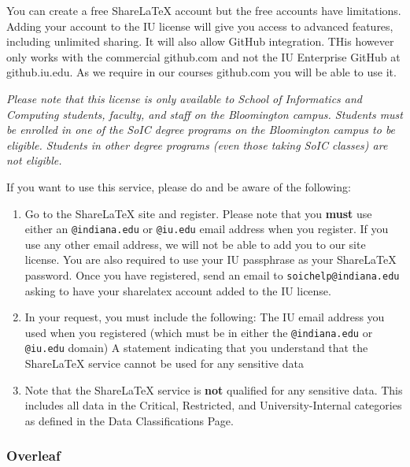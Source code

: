 You can create a free ShareLaTeX account but the free accounts have
limitations.  Adding your account to the IU license will give you access
to advanced features, including unlimited sharing.  
It will also allow GitHub integration. THis however only works with
the commercial github.com and not the IU Enterprise GitHub at
github.iu.edu. As we require in our courses github.com you will be
able to use it.

\textit{Please note that this license is only available to School of
Informatics and Computing students, faculty, and staff on the
Bloomington campus.  Students must be enrolled in one of the SoIC
degree programs on the Bloomington campus to be eligible.  Students in
other degree programs (even those taking SoIC classes) are not
eligible.}


If you want to use this service, please do and be aware of the following: 

\begin{enumerate}

\item Go to the ShareLaTeX site and register.  Please note that you
  {\bf must} use either an \verb|@indiana.edu| or \verb|@iu.edu| email
  address when you register. If you use any other email address, we
  will not be able to add you to our site license.  You are also
  required to use your IU passphrase as your ShareLaTeX password.
  Once you have registered, send an email to
  \verb|soichelp@indiana.edu| asking to have your sharelatex account 
  added to the IU license.  

\item
  In your request, you must include the following: The IU email
  address you used when you registered (which must be in either the
  \verb|@indiana.edu| or \verb|@iu.edu| domain) A statement indicating
  that you understand that the ShareLaTeX service cannot be used for
  any sensitive data

\item Note that the ShareLaTeX service is {\bf not} qualified for any
  sensitive data. This includes all data in the Critical, Restricted,
  and University-Internal categories as defined in the Data
  Classifications Page.

\end{enumerate}


\subsubsection{Overleaf}\label{overleaf}

